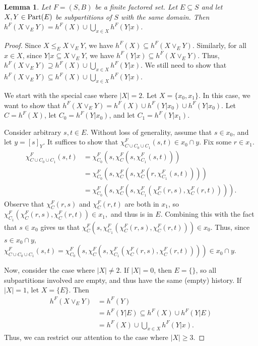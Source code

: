\documentclass[authordate,onecolumn]{miri-tech-article}
\newtheorem{lemma2}{Lemma}
\begin{document}
\begin{lemma2}\label{histlemma2}
Let $F=(S,B)$ be a finite factored set. Let $E \subseteq S$ and let $X,Y\in \parts[E]$ be subpartitions of $S$ with the same domain. Then $h^F(X\vee_EY)=h^F(X)\cup \bigcup_{x\in X}h^F(Y|x)$.
\end{lemma2}
\begin{proof}
Since $X\leq_E X\vee_E Y$, we have $h^F(X)\subseteq h^F(X\vee_E Y)$. Similarly, for all $x\in X$, since $Y|x\subseteq X\vee_E Y$, we have $h^F(Y|x)\subseteq h^F(X\vee_E Y)$. Thus, $h^F(X\vee_E Y)\supseteq h^F(X)\cup \bigcup_{x\in X}h^F(Y|x).$ We still need to show that $h^F(X\vee_E Y)\subseteq h^F(X)\cup \bigcup_{x\in X}h^F(Y|x).$

We start with the special case where $|X|=2$. Let $X=\{x_0,x_1\}$. In this case, we want to show that $h^F(X\vee_EY)=h^F(X)\cup h^F(Y|x_0)\cup h^F(Y|x_0)$. Let $C=h^F(X)$, let $C_0=h^F(Y|x_0)$, and let $C_1=h^F(Y|x_1)$.

Consider arbitrary $s,t\in E$. Without loss of generality, assume that $s\in x_0$, and let $y=[s]_Y$. It suffices to show that $\chi^F_{C\cup C_0\cup C_1}(s,t)\in x_0\cap y$. Fix some $r\in x_1$.
\begin{equation}
\begin{split}
\chi^F_{C\cup C_0\cup C_1}(s,t) & = \chi^F_{C_0}(s,\chi^F_{C}(s,\chi^F_{C_1}(s,t))) \\
 & = \chi^F_{C_0}(s,\chi^F_{C}(s,\chi^F_{C}(r,\chi^F_{C_1}(s,t))))\\
  & = \chi^F_{C_0}(s,\chi^F_{C}(s,\chi^F_{C_1}(\chi^F_{C}(r,s),\chi^F_{C}(r,t)))).
\end{split}
\end{equation}
Observe that $\chi^F_{C}(r,s)$ and $\chi^F_{C}(r,t)$ are both in $x_1$, so $\chi^F_{C_1}(\chi^F_{C}(r,s),\chi^F_{C}(r,t))\in x_1,$ and thus is in $E$. Combining this with the fact that $s\in x_0$ gives us that $\chi^F_C(s,\chi^F_{C_1}(\chi^F_{C}(r,s),\chi^F_{C}(r,t)))\in x_0.$ Thus, since $s\in x_0\cap y$, $\chi^F_{C\cup C_0\cup C_1}(s,t)=\chi^F_{C_0}(s,\chi^F_{C}(s,\chi^F_{C_1}(\chi^F_{C}(r,s),\chi^F_{C}(r,t))))\in x_0\cap y$.

Now, consider the case where $|X|\neq 2$. If $|X|=0$, then $E=\{\}$, so all subpartitions involved are empty, and thus have the same (empty) history. If $|X|=1$, let $X=\{E\}$. Then
\begin{equation} \begin{split} h^F(X\vee_E Y) & =h^F(Y) \\ & =h^F(Y|E)\subseteq h^F(X)\cup h^F(Y|E) \\ & =h^F(X)\cup \bigcup_{x\in X}h^F(Y|x). \end{split} \end{equation}
Thus, we can restrict our attention to the case where $|X|\geq 3$. 


\end{proof}
\end{document}
